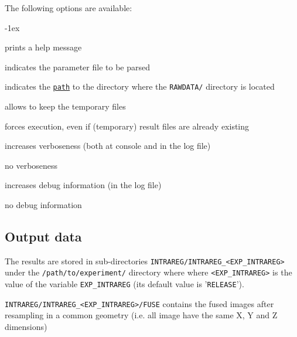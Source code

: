 The following options are available:
\begin{description}
  \itemsep -1ex
\item[\texttt{-h}] prints a help message
\item[\texttt{-p \underline{file}}] indicates the parameter file to be parsed
\item[\texttt{-e \underline{path}}] indicates the
  \texttt{\underline{path}} to the directory where the
  \texttt{RAWDATA/} directory is located
\item[\texttt{-k}] allows to keep the temporary files
\item[\texttt{-f}] forces execution, even if (temporary) result files
  are already existing
\item[\texttt{-v}] increases verboseness (both at console and in the
  log file)
\item[\texttt{-nv}] no verboseness
\item[\texttt{-d}]  increases debug information (in the
  log file)
\item[\texttt{-nd}] no debug information
\end{description}


\subsection{Output data}

The results are stored in sub-directories
\texttt{INTRAREG/INTRAREG\_<EXP\_INTRAREG>} under the
\texttt{/path/to/experiment/} directory where where \texttt{<EXP\_INTRAREG>} is the value of the variable \texttt{EXP\_INTRAREG} (its
default value is '\texttt{RELEASE}'). 



\texttt{INTRAREG/INTRAREG\_<EXP\_INTRAREG>/FUSE} contains the fused
images after resampling in a common geometry (i.e. all image have the
same X, Y and Z dimensions)




